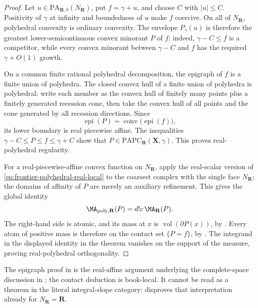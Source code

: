 \begin{proof}
Let \(u\in\mathrm{PA}_{\mathbf R,b}(N_{\mathbf R})\), put
\(f=\gamma+u\), and choose
\(C\) with \(|u|\leq C\).  Positivity of \(\gamma\) at infinity and
boundedness of \(u\) make \(f\) coercive.  On all of
\(N_{\mathbf R}\), polyhedral
convexity is ordinary convexity.  The envelope \(P_\gamma(u)\) is therefore
the greatest lower-semicontinuous convex minorant \(P\) of \(f\): indeed,
\(\gamma-C\leq f\) is a competitor, while every convex minorant between
\(\gamma-C\) and \(f\) has the required \(\gamma+O(1)\) growth.

On a common finite rational polyhedral decomposition, the epigraph of
\(f\) is a finite union of polyhedra.  The closed convex hull of a finite
union of polyhedra is polyhedral: write each member as the convex hull of
finitely many points plus a finitely generated recession cone, then take the
convex hull of all points and the cone generated by all recession directions.
Since
\[
 \operatorname{epi}(P)
 =\overline{\operatorname{conv}}\bigl(\operatorname{epi}(f)\bigr),
\]
its lower boundary is real piecewise affine.  The inequalities
\(
 \gamma-C\leq P\leq f\leq\gamma+C
\)
show that
\(P\in\mathrm{PAPC}_{\mathbf R}(\mathbf X,\gamma)\).  This proves
real-polyhedral regularity.

For a real-piecewise-affine convex function on \(N_{\mathbf R}\), apply
the real-scalar version of
\eqref{eq:frontier-polyhedral-real-local} to the coarsest complex with the
single face \(N_{\mathbf R}\); the domains of affinity of \(P\) are merely
an auxiliary refinement.  This gives the global identity
\begin{equation}
                  \MA_{\mathrm{poly},\mathbf R}(P)
                  =d!c\,\MA_{\mathbf R}(P).
 \label{eq:frontier-polyhedral-affine-global-ma}
\end{equation}
The right-hand side is atomic, and its mass at \(x\) is
\(\operatorname{vol}(\partial P(x))\), by
.  Every atom of positive mass is therefore
on the contact set \(\{P=f\}\), by
.  The integrand in
the displayed identity in the theorem vanishes on the support of the
measure, proving real-polyhedral orthogonality.
\end{proof}

The epigraph proof in 
is the real-affine argument underlying the complete-space discussion in
\cite[Remark~6.6]{BMPS26}; the contact deduction is book-local.  It cannot
be read as a theorem in the literal integral-slope category:
 disproves
that interpretation already for \(N_{\mathbf R}=\mathbf R\).


